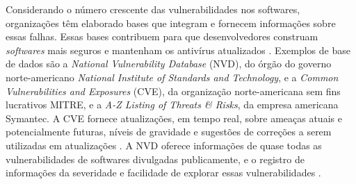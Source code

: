 Considerando o número crescente das vulnerabilidades nos softwares, organizações têm elaborado bases que integram e fornecem informações sobre essas falhas. Essas bases contribuem para que desenvolvedores construam \textit{softwares} mais seguros e mantenham os antivírus atualizados \cite{Santos:2017}. Exemplos de base de dados são a \textit{National Vulnerability Database} (NVD), do órgão do governo norte-americano \textit{National Institute of Standards and Technology}, e a \textit{Common Vulnerabilities and Exposures} (CVE), da organização norte-americana sem fins lucrativos MITRE, e a \textit{A-Z Listing of Threats \& Risks}, da empresa americana Symantec. A CVE fornece atualizações, em tempo real, sobre ameaças atuais e potencialmente futuras, níveis de gravidade e sugestões de correções a serem utilizadas em atualizações \cite{Bertucci:2017}. A NVD oferece informações de quase todas as vulnerabilidades de softwares divulgadas publicamente, e o registro de informações da severidade e facilidade de explorar essas vulnerabilidades \cite{Last:2016}.
